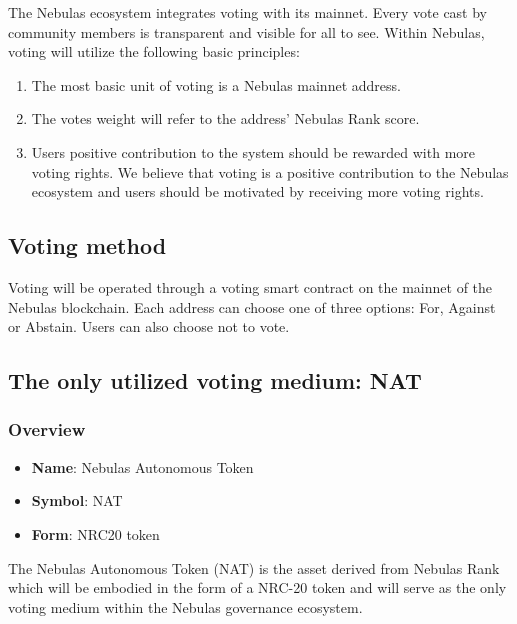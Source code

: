 The Nebulas ecosystem integrates voting with its mainnet. Every vote cast by community members is transparent and visible for all to see. Within Nebulas, voting will utilize the following basic principles:

\begin{enumerate}
	\item The most basic unit of voting is a Nebulas mainnet address.
	\item The votes weight will refer to the address' Nebulas Rank score.
	\item Users positive contribution to the system should be rewarded with more voting rights. We believe that voting is a positive contribution to the Nebulas ecosystem and users should be motivated by receiving more voting rights.
\end{enumerate}

\subsection{Voting method}

Voting will be operated through a voting smart contract on the mainnet of the Nebulas blockchain. Each address can choose one of three options: For, Against or Abstain. Users can also choose not to vote.

\subsection{The only utilized voting medium: NAT}

\label{nat}

\subsubsection{Overview}

\begin{itemize}
	\item \textbf{Name}: Nebulas Autonomous Token
	\item \textbf{Symbol}: NAT
	\item \textbf{Form}: NRC20 token
\end{itemize}

The Nebulas Autonomous Token (NAT) is the asset derived from Nebulas Rank which will be embodied in the form of a NRC-20 token and will serve as the only voting medium within the Nebulas governance ecosystem.

